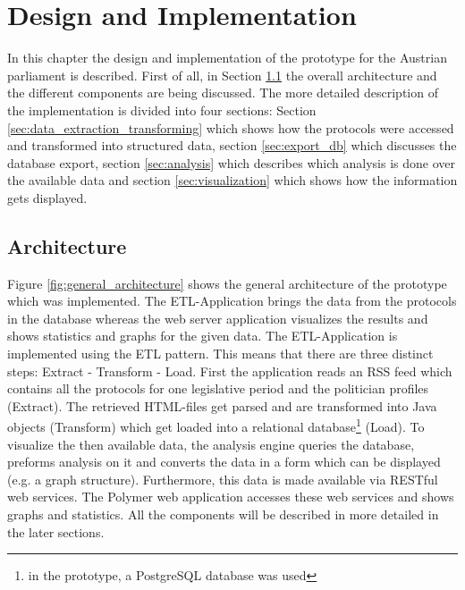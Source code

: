 \chapter{Design and Implementation}
\label{chap:implementation}

In this chapter the design and implementation of the prototype for the Austrian parliament is described. First of all, in Section \ref{sec:architecture} the overall architecture and the different components are being discussed. The more detailed description of the implementation is divided into four sections: Section \ref{sec:data_extraction_transforming} which shows how the protocols were accessed and transformed into structured data, section \ref{sec:export_db} which discusses the database export, section \ref{sec:analysis} which describes which analysis is done over the available data and section \ref{sec:visualization} which shows how the information gets displayed.

\section{Architecture}
\label{sec:architecture}
Figure \ref{fig:general_architecture} shows the general architecture of the prototype which was implemented. The ETL-Application brings the data from the protocols in the database whereas the web server application visualizes the results and shows statistics and graphs for the given data. The ETL-Application is implemented using the ETL pattern. This means that there are three distinct steps: Extract - Transform - Load. First the application reads an RSS feed which contains all the protocols for one legislative period and the politician profiles (Extract). The retrieved HTML-files get parsed and are transformed into Java objects (Transform) which get loaded into a relational database\footnote{in the prototype, a PostgreSQL database was used} (Load). To visualize the then available data, the analysis engine queries the database, preforms analysis on it and converts the data in a form which can be displayed (e.g. a graph structure). Furthermore, this data is made available via RESTful web services. The Polymer web application accesses these web services and shows graphs and statistics. All the components will be described in more detailed in the later sections.

